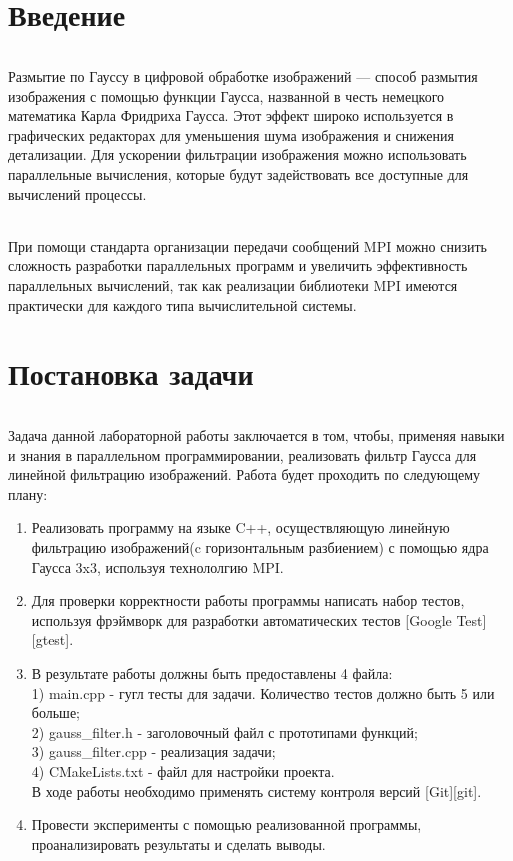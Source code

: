 \documentclass[12pt,a4paper]{article}
\begin{document}
\part*{Введение}
\paragraph{}Размытие по Гауссу в цифровой обработке изображений — способ размытия изображения с помощью функции Гаусса, названной в честь немецкого математика Карла Фридриха Гаусса. Этот эффект широко используется в графических редакторах для уменьшения шума изображения и снижения детализации. Для ускорении фильтрации изображения можно использовать параллельные вычисления, которые будут задействовать все доступные для вычислений процессы.
\paragraph{} При помощи стандарта организации передачи сообщений MPI можно снизить сложность разработки параллельных программ и увеличить эффективность параллельных вычислений, так как реализации библиотеки MPI имеются практически для каждого типа вычислительной системы.
\part*{Постановка задачи}
\paragraph{} Задача данной лабораторной работы заключается в том, чтобы, применяя навыки и знания в параллельном программировании, реализовать фильтр Гаусса для линейной фильтрацию изображений. Работа будет проходить по следующему плану:
\begin{enumerate}
\item Реализовать программу на языке C++, осуществляющую линейную фильтрацию изображений(c горизонтальным разбиением) с помощью ядра Гаусса 3x3, используя технололгию MPI.
\item Для проверки корректности работы программы написать набор тестов, используя фрэймворк для разработки автоматических тестов [Google Test][gtest].
\item  В результате работы должны быть предоставлены 4 файла:\\
1) main.cpp - гугл тесты для задачи. Количество тестов должно быть 5 или больше;\\
2) gauss\_filter.h - заголовочный файл с прототипами функций; \\
3) gauss\_filter.cpp - реализация задачи;\\
4) CMakeLists.txt - файл для настройки проекта.\\
В ходе  работы необходимо применять систему контроля версий [Git][git].
\item Провести эксперименты с помощью реализованной программы, проанализировать результаты и сделать выводы.
\end{enumerate}
\end{document}

